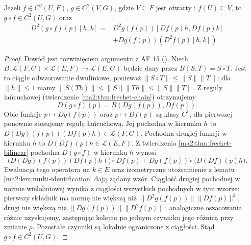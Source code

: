 \begin{stwierdzenie}
\label{ma2:prop:second-chain}
Jeżeli $f\in C^2(U,F)$, $g\in C^2(V,G)$, gdzie
$V\subseteq F$ jest otwarty i $f(U)\subseteq V$, to
$g\circ f\in C^2(U,G)$ oraz
\[
 \begin{aligned}
 D^2(g\circ f)(p)[h,k]={}&
 D^2g(f(p))[Df(p)h,Df(p)k]\\
 &+Dg(f(p))(D^2f(p)[h,k]).
 \end{aligned}
\]
\end{stwierdzenie}

\begin{proof}
Dowód jest rozwinięciem argumentu z AF 15
().
Niech $B:\mathcal L(F,G)\times\mathcal L(E,F)
\to\mathcal L(E,G)$ będzie dany przez $B(S,T)=S\circ T$.
Jest to ciągłe odwzorowanie dwuliniowe, ponieważ
$\|S\circ T\|\le\|S\|\|T\|$: dla $\|h\|\le1$
mamy $\|S(Th)\|\le\|S\|\|Th\|\le\|S\|\|T\|$.
Z reguły łańcuchowej
(twierdzenie \ref{ma2:thm:frechet-chain}) otrzymujemy
\[
 D(g\circ f)(p)=B(Dg(f(p)),Df(p)).
\]
Obie funkcje $p\mapsto Dg(f(p))$ oraz $p\mapsto Df(p)$
są klasy $C^1$; dla pierwszej ponownie stosujemy
regułę łańcuchową. Jej pochodna w kierunku $h$
to $D(Dg)(f(p))(Df(p)h)\in\mathcal L(F,G)$.
Pochodna drugiej funkcji w kierunku $h$ to
$D(Df)(p)h\in\mathcal L(E,F)$.
Z twierdzenia \ref{ma2:thm:frechet-bilinear}
pochodna $D(g\circ f)$ w kierunku $h$ wynosi
\[
 \bigl(D(Dg)(f(p))(Df(p)h)\bigr)\circ Df(p)
       +Dg(f(p))\circ\bigl(D(Df)(p)h\bigr).
\]
Ewaluacja tego operatora na $k\in E$
oraz izometryczne utożsamienie z lematu
\ref{ma2:lem:multi-identification} dają żądany wzór.
Ciągłość drugiej pochodnej w normie wieloliniowej
wynika z ciągłości wszystkich pochodnych w tym
wzorze: pierwszy składnik ma normę nie większą
niż $\|D^2g(f(p))\|\|Df(p)\|^2$, drugi nie większą
niż $\|Dg(f(p))\|\|D^2f(p)\|$; analogiczne
oszacowania różnic uzyskujemy, zastępując kolejno
po jednym czynniku jego różnicą przy zmianie $p$.
Pozostałe czynniki są lokalnie ograniczone
z ciągłości. Stąd $g\circ f\in C^2(U,G)$.
\end{proof}

